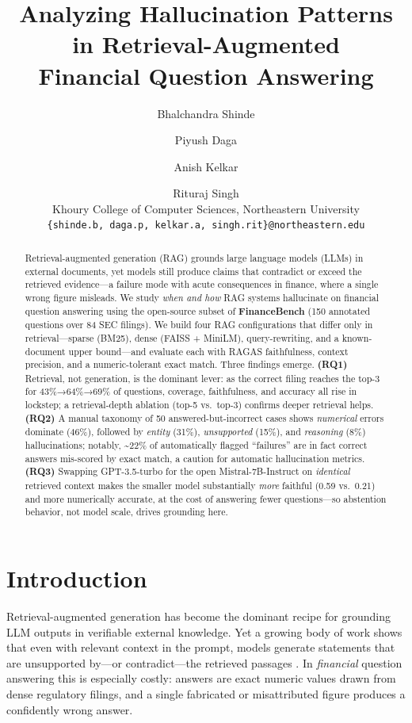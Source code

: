 \documentclass[11pt]{article}
\title{Analyzing Hallucination Patterns in Retrieval-Augmented\\Financial Question Answering}
\author{
  Bhalchandra Shinde \and Piyush Daga \and Anish Kelkar \and Rituraj Singh \\
  Khoury College of Computer Sciences, Northeastern University \\
  \texttt{\{shinde.b, daga.p, kelkar.a, singh.rit\}@northeastern.edu}
}
\begin{document}
\maketitle

\begin{abstract}
Retrieval-augmented generation (RAG) grounds large language models
(LLMs) in external documents, yet models still produce claims that
contradict or exceed the retrieved evidence---a failure mode with acute
consequences in finance, where a single wrong figure misleads. We study
\emph{when and how} RAG systems hallucinate on financial question
answering using the open-source subset of \textbf{FinanceBench} (150
annotated questions over 84 SEC filings). We build four RAG
configurations that differ only in retrieval---sparse (BM25), dense
(FAISS + MiniLM), query-rewriting, and a known-document upper
bound---and evaluate each with RAGAS faithfulness, context precision,
and a numeric-tolerant exact match. Three findings emerge.
\textbf{(RQ1)} Retrieval, not generation, is the dominant lever: as the
correct filing reaches the top-3 for 43\%→64\%→69\% of questions,
coverage, faithfulness, and accuracy all rise in lockstep; a
retrieval-depth ablation (top-5 vs.~top-3) confirms deeper retrieval
helps. \textbf{(RQ2)} A manual taxonomy of 50 answered-but-incorrect
cases shows \emph{numerical} errors dominate (46\%), followed by
\emph{entity} (31\%), \emph{unsupported} (15\%), and \emph{reasoning}
(8\%) hallucinations; notably, \textasciitilde22\% of automatically
flagged ``failures'' are in fact correct answers mis-scored by exact
match, a caution for automatic hallucination metrics. \textbf{(RQ3)}
Swapping GPT-3.5-turbo for the open Mistral-7B-Instruct on
\emph{identical} retrieved context makes the smaller model substantially
\emph{more} faithful (0.59 vs.~0.21) and more numerically accurate, at
the cost of answering fewer questions---so abstention behavior, not
model scale, drives grounding here.
\end{abstract}

\hypertarget{introduction}{%
\section{Introduction}\label{introduction}}

Retrieval-augmented generation \citep{lewis2020rag} has become the
dominant recipe for grounding LLM outputs in verifiable external
knowledge. Yet a growing body of work shows that even with relevant
context in the prompt, models generate statements that are unsupported
by---or contradict---the retrieved passages
\citep{ji2023hallucination, huang2023hallucinationsurvey}. In
\emph{financial} question answering this is especially costly: answers
are exact numeric values drawn from dense regulatory filings, and a
single fabricated or misattributed figure produces a confidently wrong
answer.
\end{document}
